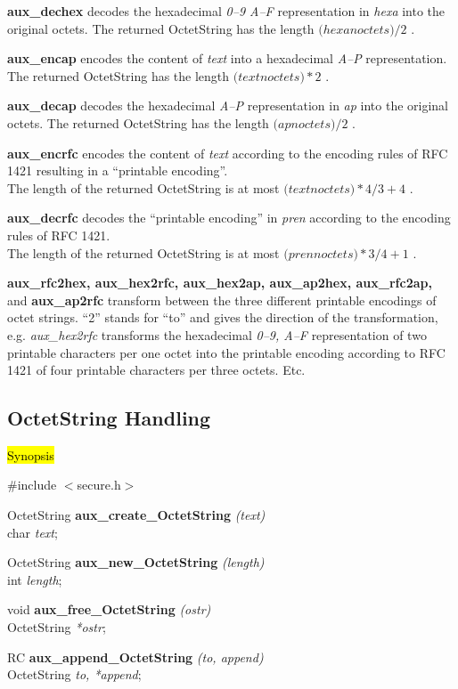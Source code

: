 {\bf aux\_dechex} decodes the hexadecimal {\em 0--9 A--F}
representation in {\em hexa}
into the original octets.
The returned OctetString has the length
$(hexa$\pf $noctets)/2$ .

{\bf aux\_encap} encodes the content of {\em text}
into a hexadecimal {\em A--P} representation.
The returned OctetString has the length
$(text$\pf $noctets)*2$ .

{\bf aux\_decap} decodes the hexadecimal {\em A--P}
representation in {\em ap}
into the original octets.
The returned OctetString has the length
$(ap$\pf $noctets)/2$ .

{\bf aux\_encrfc} encodes the content of {\em text}
according to the encoding rules of RFC 1421
resulting in a ``printable encoding''. \\
The length of the returned OctetString is at most
$(text$\pf $noctets)*4/3+4$ .

{\bf aux\_decrfc} decodes the ``printable encoding'' in {\em pren}
according to the encoding rules of RFC 1421. \\
The length of the returned OctetString is at most
$(pren$\pf $noctets)*3/4+1$ .

{\bf aux\_rfc2hex, aux\_hex2rfc, aux\_hex2ap, aux\_ap2hex,
aux\_rfc2ap,} and {\bf aux\_ap2rfc}
transform between the three different printable encodings of
octet strings. ``2'' stands for ``to'' and gives the direction
of the transformation, e.g.
{\em aux\_hex2rfc} transforms the hexadecimal {\em 0--9, A--F}
representation of two printable characters per one octet
into the printable encoding according to RFC 1421 of
four printable characters per three octets. Etc.

\subsection{OctetString Handling}
\label{aux_ostringhand}
\hl{Synopsis}

\#include $<$secure.h$>$
 
OctetString {\bf *aux\_create\_OctetString} {\em (text)} \\
char {\em *text};

OctetString {\bf *aux\_new\_OctetString} {\em (length)} \\
int {\em length};

void {\bf aux\_free\_OctetString} {\em (ostr)} \\
OctetString {\em **ostr};

RC {\bf aux\_append\_OctetString} {\em (to, append)} \\
OctetString {\em *to, *append};

